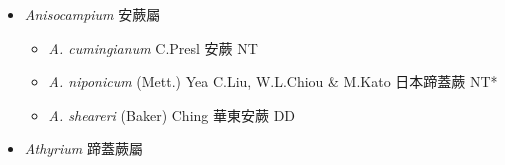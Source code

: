 
  \begin{itemize}
 \item[] \textit{Anisocampium} 安蕨屬
                                
  \begin{itemize}
        \item[] \textit{A. cumingianum} C.Presl  安蕨   NT
        \item[] \textit{A. niponicum} (Mett.) Yea C.Liu, W.L.Chiou \& M.Kato  日本蹄蓋蕨   NT*
        \item[] \textit{A. sheareri} (Baker) Ching  華東安蕨   DD
  \end{itemize}
 \item[] \textit{Athyrium} 蹄蓋蕨屬
                                

\end{itemize}
